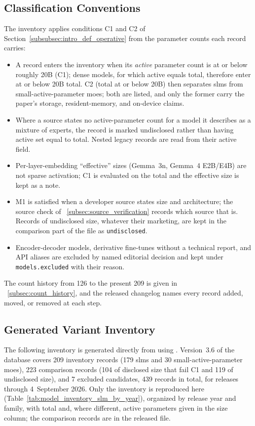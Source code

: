 \subsection{Classification Conventions}
\label{subsec:ecosystem_classification}
The inventory applies conditions C1 and C2 of Section~\ref{subsubsec:intro_def_operative} from the parameter counts each record carries:
\begin{itemize}
    \item A record enters the inventory when its \emph{active} parameter count is at or below roughly 20B (C1); dense models, for which active equals total, therefore enter at or below 20B total. C2 (total at or below 20B) then separates \glspl{slm} from small-active-parameter \glspl{moe}; both are listed, and only the former carry the paper's storage, resident-memory, and on-device claims.
    \item Where a source states no active-parameter count for a model it describes as a mixture of experts, the record is marked undisclosed rather than having active set equal to total. Nested legacy records are read from their active field.
    \item Per-layer-embedding ``effective'' sizes (Gemma~3n, Gemma~4 E2B/E4B) are not sparse activation; C1 is evaluated on the total and the effective size is kept as a note.
    \item M1 is satisfied when a developer source states size and architecture; the source check of \suppsec~\ref{subsec:source_verification} records which source that is. Records of undisclosed size, whatever their marketing, are kept in the comparison part of the file as \texttt{undisclosed}.
    \item Encoder-decoder models, derivative fine-tunes without a technical report, and API aliases are excluded by named editorial decision and kept under \texttt{models.excluded} with their reason.
\end{itemize}
The count history from 126 to the present 209 is given in \suppsec~\ref{subsec:count_history}, and the released changelog names every record added, moved, or removed at each step.

\subsection{Generated Variant Inventory}
\label{subsec:ecosystem_generated_inventory}
The following inventory is generated directly from  using . Version~3.6 of the database covers 209 inventory records (179 \glspl{slm} and 30 small-active-parameter \glspl{moe}), 223 comparison records (104 of disclosed size that fail C1 and 119 of undisclosed size), and 7 excluded candidates, 439 records in total, for releases through 4~September 2026. Only the inventory is reproduced here (Table~\ref{tab:model_inventory_slm_by_year}), organized by release year and family, with total and, where different, active parameters given in the size column; the comparison records are in the released file.


